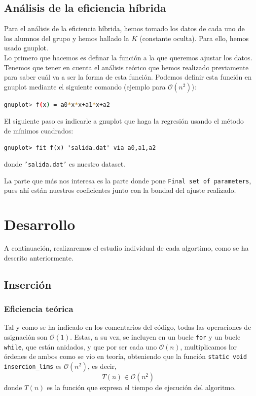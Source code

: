 \documentclass[10pt,a4paper]{article}
\begin{document}
\subsection{Análisis de la eficiencia híbrida}
Para el análisis de la eficiencia híbrida, hemos tomado los datos de cada uno de los alumnos del grupo y hemos hallado la \(K\) (constante oculta). Para ello, hemos usado gnuplot. \\

Lo primero que hacemos es definar la función a la que queremos ajustar los datos. Tenemos que tener en cuenta el análisis teórico que hemos realizado previamente para saber cuál va a ser la forma de esta función. Podemos definir esta función en gnuplot mediante el siguiente comando (ejemplo para \(\mathcal{O}(n^2)\)):
\begin{lstlisting}[language=bash]
gnuplot> f(x) = a0*x*x+a1*x+a2
\end{lstlisting}

El siguiente paso es indicarle a gnuplot que haga la regresión usando el método de mínimos cuadrados:
\begin{lstlisting}
gnuplot> fit f(x) 'salida.dat' via a0,a1,a2
\end{lstlisting}
donde \texttt{'salida.dat'} es nuestro dataset. 

La parte que más nos interesa es la parte donde pone \texttt{Final set of parameters}, pues ahí están nuestros coeficientes junto con la bondad del ajuste realizado.

\section{Desarrollo}

A continuación, realizaremos el estudio individual de cada algortimo, como se ha descrito anteriormente.

\subsection{Inserción}
\scalebox{0.75}{

}

\subsubsection{Eficiencia teórica}
Tal y como se ha indicado en los comentarios del código, todas las operaciones de asignación son \(\mathcal{O}(1)\). Estas, a su vez, se incluyen en un bucle \texttt{for} y un bucle \texttt{while}, que están anidados, y que por ser cada uno \(\mathcal{O}(n)\), multiplicamos lor órdenes de ambos como se vio en teoría, obteniendo que la función \texttt{static void insercion\_lims} es \(\mathcal{O}(n^2)\), es decir,
\[
T(n) \in \mathcal{O}(n^2)
\]
donde \(T(n)\) es la función que expresa el tiempo de ejecución del algoritmo.
\end{document}
